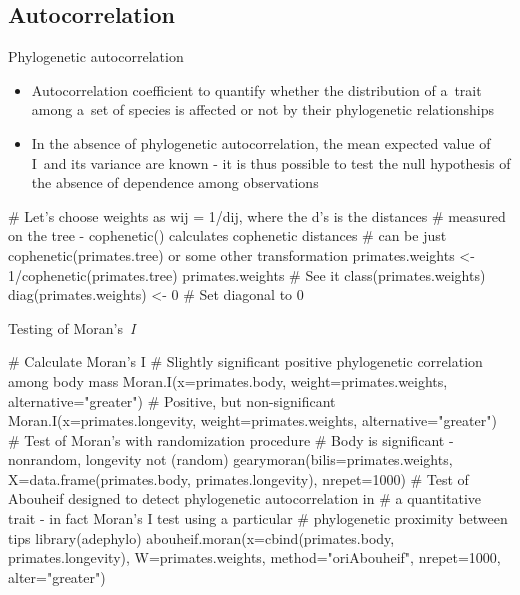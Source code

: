\documentclass[compress, ucs, xelatex, 11pt, xcolor=svgnames,
  hyperref={
    bookmarks=true,
    unicode=true,
    colorlinks=true,
    pdftitle={Molecular data in R},
    plainpages=false,
    pdfauthor={Vojtech Zeisek},
    pdfsubject={Course about phylogeny and evolution in R},
    pdfcreator={XeLaTeX},
    pdfkeywords={R, evolution, phylogeny, molecular data},
    linkcolor=Tomato,
    anchorcolor=SaddleBrown,
    citecolor=Goldenrod,
    filecolor=DarkMagenta,
    menucolor=Sienna,
    urlcolor=DarkTurquoise,
    pdftex},
  url={hyphens, lowtilde} %
  ]{beamer}
\begin{document}
\subsection{Autocorrelation}

\begin{frame}[fragile]{Phylogenetic autocorrelation}
  \begin{itemize}
    \item Autocorrelation coefficient to quantify whether the distribution of a~trait among a~set of species is affected or not by their phylogenetic relationships
    \item In the absence of phylogenetic autocorrelation, the mean expected value of I~and its variance are known - it is thus possible to test the null hypothesis of the absence of dependence among observations
  \end{itemize}
  \begin{spluscode}
    # Let's choose weights as wij = 1/dij, where the d’s is the distances
    # measured on the tree - cophenetic() calculates cophenetic distances
    # can be just cophenetic(primates.tree) or some other transformation
    primates.weights <- 1/cophenetic(primates.tree)
    primates.weights # See it
    class(primates.weights)
    diag(primates.weights) <- 0 # Set diagonal to 0
  \end{spluscode}
\end{frame}

\begin{frame}[fragile]{Testing of Moran's~\textit{I}}
  \begin{spluscode}
    # Calculate Moran's I
    # Slightly significant positive phylogenetic correlation among body mass
    Moran.I(x=primates.body, weight=primates.weights,
      alternative="greater")
    # Positive, but non-significant
    Moran.I(x=primates.longevity, weight=primates.weights,
      alternative="greater")
    # Test of Moran's with randomization procedure
    # Body is significant - nonrandom, longevity not (random)
    gearymoran(bilis=primates.weights, X=data.frame(primates.body,
      primates.longevity), nrepet=1000)
    # Test of Abouheif designed to detect phylogenetic autocorrelation in
    # a quantitative trait - in fact Moran's I test using a particular
    # phylogenetic proximity between tips
    library(adephylo)
    abouheif.moran(x=cbind(primates.body, primates.longevity),
      W=primates.weights, method="oriAbouheif", nrepet=1000,
      alter="greater")
  \end{spluscode}
\end{frame}
\end{document}
